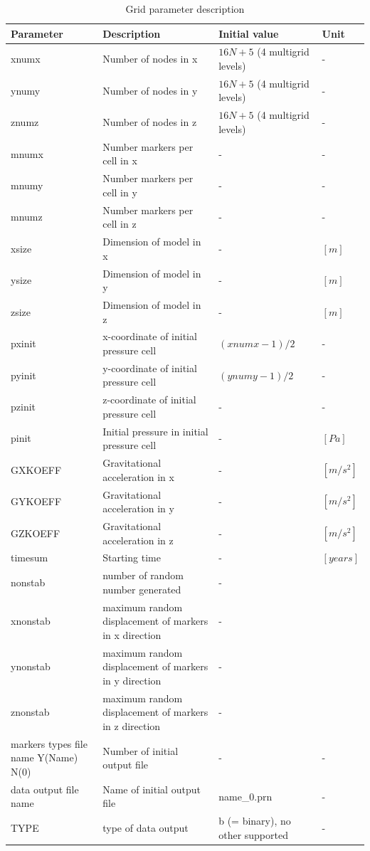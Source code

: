 \begin{table}[H]
	\small
	\centering
	\begin{tabular}{p{3cm} p{6cm} p{3cm} l}
		\toprule
		Parameter & Description & Initial value & Unit\\
		\midrule
		xnumx & Number of nodes in x & $16N+5$ (4 multigrid levels) & - \\
		ynumy & Number of nodes in y & $16N+5$ (4 multigrid levels) & - \\
		znumz & Number of nodes in z & $16N+5$ (4 multigrid levels) & - \\
		mnumx & Number markers per cell in x & - & - \\
		mnumy & Number markers per cell in y & - & - \\
		mnumz & Number markers per cell in z & - & - \\
		xsize & Dimension of model in x & - & $[m]$ \\
		ysize & Dimension of model in y & - & $[m]$ \\
		zsize & Dimension of model in z & - & $[m]$ \\
		pxinit & x-coordinate of initial pressure cell & $(xnumx-1)/2$ & - \\
		pyinit & y-coordinate of initial pressure cell & $(ynumy-1)/2$ & - \\
		pzinit & z-coordinate of initial pressure cell & - & - \\
		pinit & Initial pressure in initial pressure cell & - & $[Pa]$ \\
		GXKOEFF & Gravitational acceleration in x & - & $[m/s^2]$ \\
		GYKOEFF & Gravitational acceleration in y & - & $[m/s^2]$ \\
		GZKOEFF & Gravitational acceleration in z & - & $[m/s^2]$ \\
		timesum & Starting time & - & $[years]$ \\
		nonstab & number of random number generated & - &  \\
		xnonstab & maximum random displacement of markers in x direction & - &  \\
		ynonstab & maximum random displacement of markers in y direction & - &  \\
		znonstab & maximum random displacement of markers in z direction & - &  \\
		\footnotesize{markers types file name Y(Name) N(0)} & Number of initial output file & - & - \\
		\footnotesize{data output file name} & Name of initial output file & name\_0.prn & - \\
		TYPE	& type of data output & b (= binary), no other supported & - \\
		
		\bottomrule
	\end{tabular}
	\caption{Grid parameter description}
	\label{tbl:grid_parameter_description}
\end{table}

